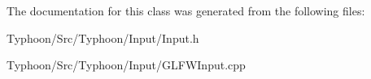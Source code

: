 The documentation for this class was generated from the following files\+:\begin{DoxyCompactItemize}
\item 
Typhoon/\+Src/\+Typhoon/\+Input/Input.\+h\item 
Typhoon/\+Src/\+Typhoon/\+Input/G\+L\+F\+W\+Input.\+cpp\end{DoxyCompactItemize}
